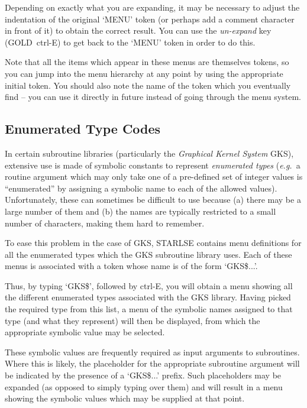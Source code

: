 Depending on exactly what you are expanding, it may be necessary to adjust
the indentation of the original `MENU' token (or perhaps add a comment
character in front of it) to obtain the correct result.
You can use the {\em un-expand} key (GOLD~ctrl-E) to get back to the `MENU'
token in order to do this.

Note that all the items which appear in these menus are themselves tokens,
so you can jump into the menu hierarchy at any point by using the
appropriate initial token.
You should also note the name of the token which you eventually find -- you
can use it directly in future instead of going through the menu system.


\subsection{Enumerated Type Codes}

In certain subroutine libraries (particularly the {\em Graphical Kernel
System} \mbox{GKS}), extensive use is made of symbolic constants to
represent {\em enumerated types} ({\em e.g.}\ a routine argument which may
only take one of a pre-defined set of integer values is ``enumerated'' by
assigning a symbolic name to each of the allowed values).
Unfortunately, these can sometimes be difficult to use because (a) there may
be a large number of them and (b) the names are typically restricted to a
small number of characters, making them hard to remember.

To ease this problem in the case of GKS, \mbox{STARLSE} contains menu
definitions for all the enumerated types which the GKS subroutine library
uses.
Each of these menus is associated with a token whose name is of the form
`GKS\$...'.

Thus, by typing `GKS\$', followed by \mbox{ctrl-E}, you will obtain a menu
showing all the different enumerated types associated with the \mbox{GKS}
library.
Having picked the required type from this list, a menu of the symbolic names
assigned to that type (and what they represent) will then be displayed, from
which the appropriate symbolic value may be selected.

These symbolic values are frequently required as input arguments to
subroutines.
Where this is likely, the placeholder for the appropriate subroutine argument
will be indicated by the presence of a `GKS\$...' prefix.
Such placeholders may be expanded (as opposed to simply typing over them)
and will result in a menu showing the symbolic values which may be supplied
at that point.


